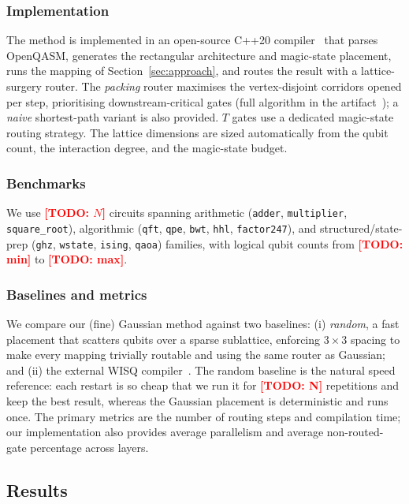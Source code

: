 \documentclass[10pt,conference]{IEEEtran}
\theoremstyle{definition}
\theoremstyle{remark}
\newcommand{\todo}[1]{\textcolor{red}{\textbf{[TODO: #1]}}}
\begin{document}
\subsubsection{Implementation} The method is implemented in an open-source C++20
compiler~\cite{ftqc} that parses OpenQASM, generates the rectangular architecture and
magic-state placement, runs the mapping of Section~\ref{sec:approach}, and
routes the result with a lattice-surgery router. The \emph{packing}
router maximises the vertex-disjoint corridors opened per step, prioritising
downstream-critical gates (full algorithm in the artifact~\cite{ftqc}); a
\emph{naive} shortest-path variant is also provided. $T$ gates use a dedicated magic-state routing strategy.
The lattice dimensions are sized automatically from the qubit count, the
interaction degree, and the magic-state budget.

\subsubsection{Benchmarks} We use \todo{$N$} circuits spanning arithmetic
(\texttt{adder}, \texttt{multiplier}, \texttt{square\_root}), algorithmic
(\texttt{qft}, \texttt{qpe}, \texttt{bwt}, \texttt{hhl}, \texttt{factor247}),
and structured/state-prep (\texttt{ghz}, \texttt{wstate}, \texttt{ising},
\texttt{qaoa}) families, with logical qubit counts from \todo{min} to
\todo{max}.

\subsubsection{Baselines and metrics} We compare our (fine) Gaussian method
against two baselines:
(i) \emph{random}, a fast placement that scatters qubits over a sparse
sublattice, enforcing $3\times3$ spacing to make every mapping trivially
routable and using the same router as Gaussian; and 
(ii) the external WISQ compiler~\cite{wisq}. The random baseline is
the natural speed reference: each restart is so cheap that we run it for \todo{N}
repetitions and keep the best result, whereas the Gaussian placement
is deterministic and runs once. The primary metrics are the number of
routing steps and compilation time; our implementation also provides average parallelism and average 
non-routed-gate percentage across layers.

\subsection{Results}
\end{document}
